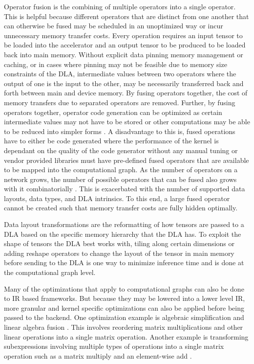 Operator fusion is the combining of multiple operators into a single operator.
This is helpful because different operators that are distinct from one another
that can otherwise be fused may be scheduled in an unoptimized way or incur
unnecessary memory transfer costs. Every operation requires an input tensor to
be loaded into the accelerator and an output tensor to be produced to be loaded
back into main memory. Without explicit data pinning memory management or
caching, or in cases where pinning may not be feasible due to memory size
constraints of the DLA, intermediate values between two operators where the
output of one is the input to the other, may be necessarily transferred back
and forth between main and device memory. By fusing operators together,
the cost of memory transfers due to separated operators are removed.
Further, by fusing operators together, operator code generation can
be optimized as certain intermediate values may not have to be stored or other
computations may be able to be reduced into simpler forms \cite{TVM} \cite{ONNX}.
A disadvantage to this is, fused operations have to either be code generated
where the performance of the kernel is dependant on the quality of the code
generator without any manual tuning or vendor provided libraries must have
pre-defined fused operators that are available to be mapped into the computational
graph. As the number of operators on a network grows, the number of possible
operators that can be fused also grows with it combinatorially \cite{TVM}.
This is exacerbated with the number of supported data layouts, data types, 
and DLA intrinsics. To this end, a large fused operator
cannot be created such that memory transfer costs are fully hidden optimally.

Data layout transformations are the reformatting of how tensors are passed
to a DLA based on the specific memory hierarchy that the DLA has. To exploit
the shape of tensors the DLA best works with, tiling along certain dimensions or
adding reshape operators to change the layout of the tensor in main memory before
sending to the DLA is one way to minimize inference time and is done at the
computational graph level.

Many of the optimizations that apply to computational graphs can also be done
to IR based frameworks. But because they may be lowered into a lower level IR,
more granular and kernel specific optimizations can also be applied before
being passed to the backend. One optimization example is algebraic
simplification and linear algebra fusion \cite{DLVM}. This involves reordering
matrix multiplications and other linear operations into a single matrix
operation. Another example is transforming subexpressions involving multiple
types of operations into a single matrix operation such as a matrix multiply
and an element-wise add \cite{DLVM}.

